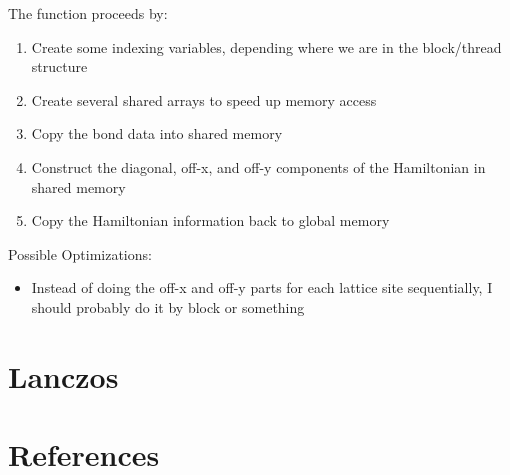 \documentclass{article}
\begin{document}
The function proceeds by:
\begin{enumerate}
\item{Create some indexing variables, depending where we are in the block/thread structure}
\item{Create several shared arrays to speed up memory access}
\item{Copy the bond data into shared memory}
\item{Construct the diagonal, off-x, and off-y components of the Hamiltonian in shared memory}
\item{Copy the Hamiltonian information back to global memory}
\end{enumerate}

Possible Optimizations:
\begin{itemize}
\item{Instead of doing the off-x and off-y parts for each lattice site sequentially, I should probably do it by block or something}
\end{itemize}

\section{Lanczos}

\section{References}
\end{document}
